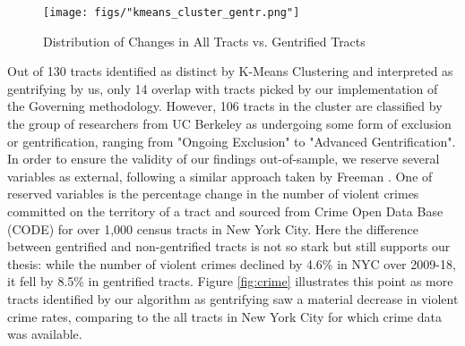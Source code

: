\documentclass[a4paper, 12pt]{article}
\numberwithin{equation}{section}
\begin{document}
		\begin{figure}[H]
			\centering
			\texttt{[image: figs/"kmeans\_cluster\_gentr.png"]}
			\caption{Distribution of Changes in All Tracts vs. Gentrified Tracts}
			\label{fig:distr}
		\end{figure}
	
		\begin{table}[H]
			\centering
				\caption{Kolmogorov-Smirnov Test Results and Distribution Statistics}
				\label{tab:dist}
		\end{table}
		
		Out of 130 tracts identified as distinct by K-Means Clustering and interpreted as gentrifying by us, only 14 overlap with tracts picked by our implementation of the Governing methodology. However, 106 tracts in the cluster are classified by the group of researchers from UC Berkeley as undergoing some form of exclusion or gentrification, ranging from "Ongoing Exclusion" to "Advanced Gentrification". \\
		
		In order to ensure the validity of our findings out-of-sample, we reserve several variables as external, following a similar approach taken by Freeman \cite{Freeman05}. One of reserved variables is the percentage change in the number of violent crimes committed on the territory of a tract and sourced from Crime Open Data Base (CODE) for over 1,000 census tracts in New York City. Here the difference between gentrified and non-gentrified tracts is not so stark but still supports our thesis: while the number of violent crimes declined by 4.6\% in NYC over 2009-18, it fell by 8.5\% in gentrified tracts. Figure \ref{fig:crime} illustrates this point as more tracts identified by our algorithm as gentrifying saw a material decrease in violent crime rates, comparing to the all tracts in New York City for which crime data was available.
\end{document}
